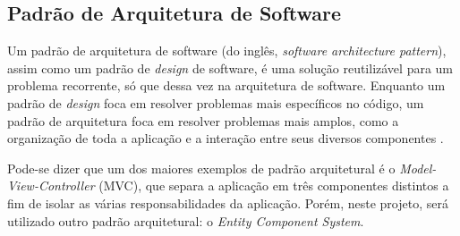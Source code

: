 \subsection{Padrão de Arquitetura de Software}

Um padrão de arquitetura de software (do inglês, \textit{software architecture pattern}), assim como um padrão de \textit{design} de software, é uma solução reutilizável para um problema recorrente, só que dessa vez na arquitetura de software. Enquanto um padrão de \textit{design} foca em resolver problemas mais específicos no código, um padrão de arquitetura foca em resolver problemas mais amplos, como a organização de toda a aplicação e a interação entre seus diversos componentes \cite{fundsoftwarearchitecture}.

Pode-se dizer que um dos maiores exemplos de padrão arquitetural é o \textit{Model-View-Controller} (MVC), que separa a aplicação em três componentes distintos a fim de isolar as várias responsabilidades da aplicação. Porém, neste projeto, será utilizado outro padrão arquitetural: o \textit{Entity Component System}.
